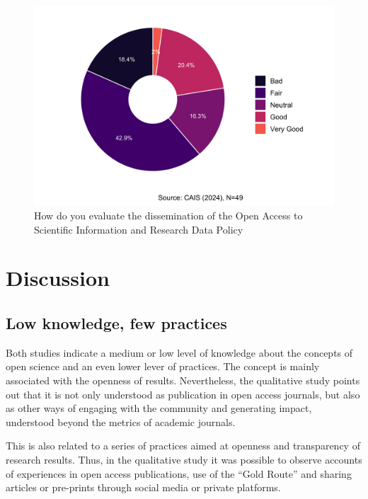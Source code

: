 \documentclass[
  letterpaper,
  DIV=11,
  numbers=noendperiod]{scrartcl}
\begin{document}
\begin{figure}[H]

{\centering \includegraphics{paper_files/figure-pdf/fig-vanid-2-1.png}

}

\caption{\label{fig-vanid-2}How do you evaluate the dissemination of the
Open Access to Scientific Information and Research Data Policy}

\end{figure}

\hypertarget{discussion}{%
\section{Discussion}\label{discussion}}

\hypertarget{low-knowledge-few-practices}{%
\subsection{Low knowledge, few
practices}\label{low-knowledge-few-practices}}

Both studies indicate a medium or low level of knowledge about the
concepts of open science and an even lower lever of practices. The
concept is mainly associated with the openness of results. Nevertheless,
the qualitative study points out that it is not only understood as
publication in open access journals, but also as other ways of engaging
with the community and generating impact, understood beyond the metrics
of academic journals.

This is also related to a series of practices aimed at openness and
transparency of research results. Thus, in the qualitative study it was
possible to observe accounts of experiences in open access publications,
use of the ``Gold Route'' and sharing articles or pre-prints through
social media or private platforms.
\end{document}
